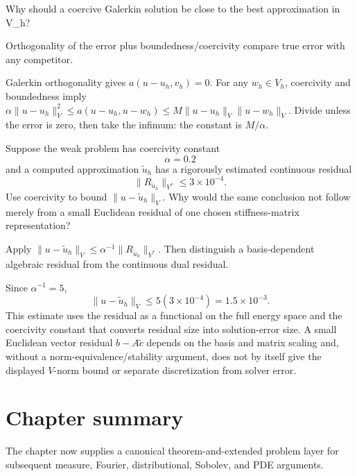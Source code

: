 \begin{exercise}\label{exr:iii23-expand-16}
Why should a coercive Galerkin solution be close to the best approximation in V\_h?
\end{exercise}
\begin{hint}
Orthogonality of the error plus boundedness/coercivity compare true error with any competitor.
\end{hint}
\begin{solution}
Galerkin orthogonality gives $a(u-u_h,v_h)=0$. For any $w_h\in V_h$, coercivity and boundedness imply $\alpha\|u-u_h\|_V^2\le a(u-u_h,u-w_h)\le M\|u-u_h\|_V\|u-w_h\|_V$. Divide unless the error is zero, then take the infimum: the constant is $M/\alpha$.
\end{solution}
\begin{exercise}\label{exr:iii23-numerical-residual-01}
Suppose the weak problem has coercivity constant
\[
\alpha=0.2
\]
and a computed approximation \(\widetilde u_h\) has a rigorously estimated
continuous residual
\[
\|R_{\widetilde u_h}\|_{V^*}\le 3\times10^{-4}.
\]
Use coercivity to bound \(\|u-\widetilde u_h\|_V\).  Why would the same
conclusion not follow merely from a small Euclidean residual of one chosen
stiffness-matrix representation?
\end{exercise}
\begin{hint}
Apply
\(\|u-\widetilde u_h\|_V\le\alpha^{-1}\|R_{\widetilde u_h}\|_{V^*}\).
Then distinguish a basis-dependent algebraic residual from the continuous
dual residual.
\end{hint}
\begin{solution}
Since \(\alpha^{-1}=5\),
\[
\|u-\widetilde u_h\|_V
\le
5(3\times10^{-4})
=
1.5\times10^{-3}.
\]
This estimate uses the residual as a functional on the full energy space and
the coercivity constant that converts residual size into solution-error size.
A small Euclidean vector residual \(b-A\widetilde c\) depends on the basis and
matrix scaling and, without a norm-equivalence/stability argument, does not by
itself give the displayed \(V\)-norm bound or separate discretization from
solver error.
\end{solution}

\section*{Chapter summary}
The chapter now supplies a canonical theorem-and-extended problem layer for subsequent measure, Fourier, distributional, Sobolev, and PDE arguments.
